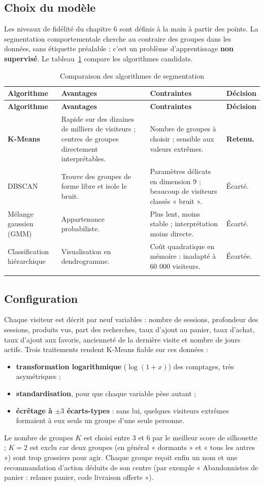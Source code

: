 \subsection{Choix du modèle}
Les niveaux de fidélité du chapitre 6 sont définis à la main à partir des points. La segmentation comportementale cherche au contraire des groupes dans les données, sans étiquette préalable : c'est un problème d'apprentissage \textbf{non supervisé}. Le tableau~\ref{tab:comparaison-seg} compare les algorithmes candidats.
\renewcommand{\arraystretch}{1.4}
\begin{longtable}{|p{3.1cm}|p{4.3cm}|p{4.3cm}|p{2.5cm}|}
\hline
\textbf{Algorithme} & \textbf{Avantages} & \textbf{Contraintes} & \textbf{Décision} \\
\hline
\endfirsthead
\hline
\textbf{Algorithme} & \textbf{Avantages} & \textbf{Contraintes} & \textbf{Décision} \\
\hline
\endhead
\textbf{K-Means} & Rapide sur des dizaines de milliers de visiteurs ; centres de groupes directement interprétables. & Nombre de groupes à choisir ; sensible aux valeurs extrêmes. & \textbf{Retenu.} \\
\hline
DBSCAN & Trouve des groupes de forme libre et isole le bruit. & Paramètres délicats en dimension 9 ; beaucoup de visiteurs classés « bruit ». & Écarté. \\
\hline
Mélange gaussien (GMM) & Appartenance probabiliste. & Plus lent, moins stable ; interprétation moins directe. & Écarté. \\
\hline
Classification hiérarchique & Visualisation en dendrogramme. & Coût quadratique en mémoire : inadapté à 60 000 visiteurs. & Écartée. \\
\hline
\caption{Comparaison des algorithmes de segmentation}
\label{tab:comparaison-seg}
\end{longtable}

\subsection{Configuration}
Chaque visiteur est décrit par neuf variables : nombre de sessions, profondeur des sessions, produits vus, part des recherches, taux d'ajout au panier, taux d'achat, taux d'ajout aux favoris, ancienneté de la dernière visite et nombre de jours actifs. Trois traitements rendent K-Means fiable sur ces données :
\begin{itemize}
  \item \textbf{transformation logarithmique} ($\log(1+x)$) des comptages, très asymétriques ;
  \item \textbf{standardisation}, pour que chaque variable pèse autant ;
  \item \textbf{écrêtage à $\pm 3$ écarts-types} : sans lui, quelques visiteurs extrêmes formaient à eux seuls un groupe d'une seule personne.
\end{itemize}
Le nombre de groupes $K$ est choisi entre 3 et 6 par le meilleur score de silhouette ; $K = 2$ est exclu car deux groupes (en général « dormants » et « tous les autres ») sont trop grossiers pour agir. Chaque groupe reçoit enfin un nom et une recommandation d'action déduits de son centre (par exemple « Abandonnistes de panier : relance panier, code livraison offerte »).

